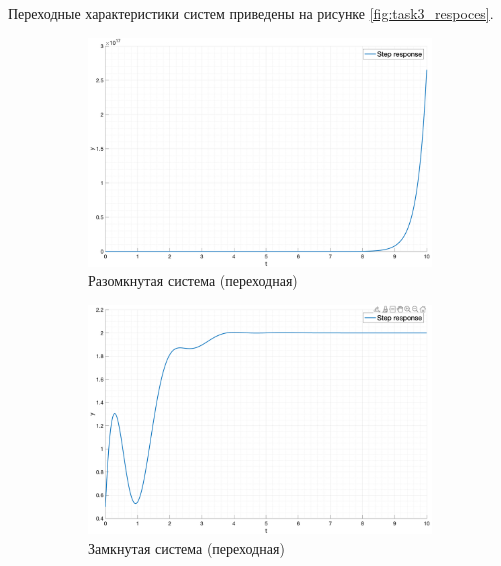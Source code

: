 Переходные характеристики систем приведены на рисунке \ref{fig:task3_respoces}.
\begin{figure}[ht!]
    \centering
    \begin{subfigure}{0.5\textwidth}
        \includegraphics[width=\textwidth]{media/plots/task3_step_response_open.png}
        \caption{Разомкнутая система (переходная)}
        \label{fig:task3_step:open}
    \end{subfigure}%
    \begin{subfigure}{0.5\textwidth}
        \includegraphics[width=\textwidth]{media/plots/task3_step_response_closed.png}
        \caption{Замкнутая система (переходная)}
        \label{fig:task3_step:closed}
    \end{subfigure}
    \begin{subfigure}{0.5\textwidth}

\end{subfigure}
\end{figure}
